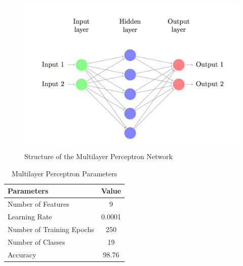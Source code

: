 \documentclass[12pt]{article}
\theoremstyle{definition}
\begin{document}
		\begin{figure}
			\centering
			\includegraphics[width=400pt]{pictures/mlp-network-diagram.png}
			\caption{Structure of the Multilayer Perceptron Network}
			\label{fig:mlp-net}
		\end{figure}
		
		\begin{table}[h!]
			\centering
			\caption{Multilayer Perceptron Parameters}
			\label{tab:mlp-params}
			\begin{tabular}{|l|c|}
				\hline
				\bfseries{Parameters} & \textbf{Value} \\ \hline
				Number of Features & 9 \\
				Learning Rate & 0.0001 \\
				Number of Training Epochs & 250 \\
				Number of Classes & 19 \\ 
				Accuracy & 98.76 \\
				\hline	
			\end{tabular}
			
		\end{table}
		
\end{document}
